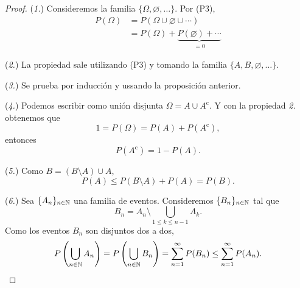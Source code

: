 \begin{proof}
    (\textit{1.}) Consideremos la familia $\{ \Omega, \varnothing, \ldots \}$. Por (P3), 
    \begin{align*}
        P(\Omega) &= P(\Omega \cup \varnothing \cup \cdots) \\
        &= P(\Omega) + \underbrace{P(\varnothing) + \cdots}_{=0}
    \end{align*}

    (\textit{2.}) La propiedad sale utilizando (P3) y tomando la familia $\{ A, B, \varnothing, \ldots \}$.

    (\textit{3.}) Se prueba por inducción y ussando la proposición anterior.

    (\textit{4.}) Podemos escribir como unión disjunta $\Omega = A \cup A^{\mathrm{c}}$. Y con la propiedad \textit{2.} obtenemos que
    \begin{equation*}
        1 = P(\Omega) = P(A) + P(A^{\mathrm{c}}),
    \end{equation*}
    entonces
    \begin{equation*}
        P(A^{\mathrm{c}}) = 1 - P(A).
    \end{equation*}

    (\textit{5.}) Como $B = (B \setminus A) \cup A$,
    \begin{equation*}
        P(A) \leq P(B \setminus A) + P(A) = P(B).
    \end{equation*}

    (\textit{6.}) Sea $\{A_n\}_{n \in \mathbb{N}}$ una familia de eventos. Consideremos $\{B_n\}_{n \in \mathbb{N}}$ tal que
    \begin{equation*}
        B_n = A_n \setminus \bigcup_{1 \leq k \leq n-1} A_k.
    \end{equation*}
    Como los eventos $B_n$ son disjuntos dos a dos,
    \begin{equation*}
        P\left(\bigcup_{n \in \mathbb{N}} A_n\right) = P\left(\bigcup_{n \in \mathbb{N}} B_n\right) = \sum_{n = 1}^{\infty} P(B_n) \leq \sum_{n = 1}^{\infty} P(A_n).
    \end{equation*}
\end{proof}



